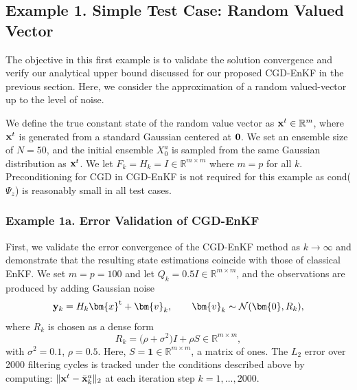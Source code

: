 \documentclass[11p]{elsarticle}
\numberwithin{equation}{section}
\newcommand{\vect}[1]{\ensuremath{\bm{#1}}}
\begin{document}
\subsection{Example 1. Simple Test Case: Random Valued Vector}
\label{sec:ex1}


The objective in this first example is to validate the solution convergence and verify our analytical upper bound discussed for our proposed CGD-EnKF in the previous section. 
Here, we consider the approximation of a random valued-vector up to the level of noise.

We define the true constant state of the random value vector as ${\bf x}^t \in \mathbb{R}^m$, where ${\bf x}^t$ is generated from a standard Gaussian centered at ${\bf 0}$.  We set an ensemble size of $N=50$, and the initial ensemble $X_0^a$ is sampled from the same Gaussian distribution as ${\bf x}^t$.  We let $F_k=H_k=I \in \mathbb{R}^{m \times m}$ where $m=p$ for all $k$.  {Preconditioning for CGD in CGD-EnKF is not required for this example as cond($\Psi_z$) is reasonably small in all test cases.}


\subsubsection{Example 1a. Error Validation of CGD-EnKF}

First, we validate the error convergence of the CGD-EnKF method as $k \rightarrow \infty$ and demonstrate that the resulting state estimations coincide with those of classical EnKF.  We set $m=p=100$ and let $Q_k=0.5I 
\in \mathbb{R}^{m \times m}$, and the  observations are produced by adding Gaussian noise
\begin{equation}
    {\bf y}_k = H_{k}\vect{x}^{\text{t}} + \vect{v}_k, \qquad \vect{v}_k \sim \mathcal{N}(\vect{0},R_k),
\end{equation}
where $R_k$ is chosen as a dense  form
    \begin{equation}
    R_k = \bigl(\rho + \sigma^2 \bigr)I + \rho S \in \mathbb{R}^{m \times m},
    \end{equation}
    with $\sigma^2 = 0.1$, $\rho = 0.5$.
Here, $S=\mathbf{1}\in\mathbb{R}^{m \times m}$, a matrix of ones.
The $L_2$ error over 2000 filtering cycles is tracked under the conditions described above by computing:
$\|{\bf x}^t - \bar{\bf x}_k^a\|_2$
at each iteration step $k=1,...,2000$.
\end{document}
